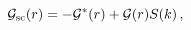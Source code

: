 \begin{equation}
{\mathcal G}_{\rm sc}(r) = -{\mathcal G}^{*}(r) + {\mathcal G}(r)S(k) 
\, ,
\end{equation}

